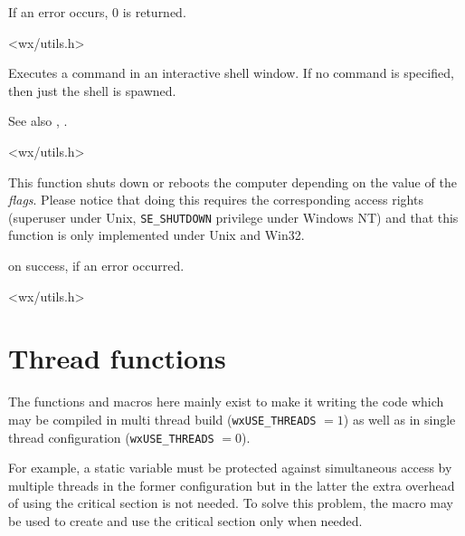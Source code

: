 If an error occurs, $0$ is returned.


<wx/utils.h>


\label{wxshell}


Executes a command in an interactive shell window. If no command is
specified, then just the shell is spawned.

See also , .


<wx/utils.h>


\label{wxshutdown}


This function shuts down or reboots the computer depending on the value of the
{\it flags}. Please notice that doing this requires the corresponding access
rights (superuser under Unix, {\tt SE\_SHUTDOWN} privilege under Windows NT)
and that this function is only implemented under Unix and Win32.




\true on success, \false if an error occurred.


<wx/utils.h>



\section{Thread functions}\label{threadfunctions}

The functions and macros here mainly exist to make it writing the code which
may be compiled in multi thread build ({\tt wxUSE\_THREADS} $= 1$) as well as
in single thread configuration ({\tt wxUSE\_THREADS} $= 0$).

For example, a static variable must be protected against simultaneous access by
multiple threads in the former configuration but in the latter the extra
overhead of using the critical section is not needed. To solve this problem,
the  macro may be used
to create and use the critical section only when needed.

